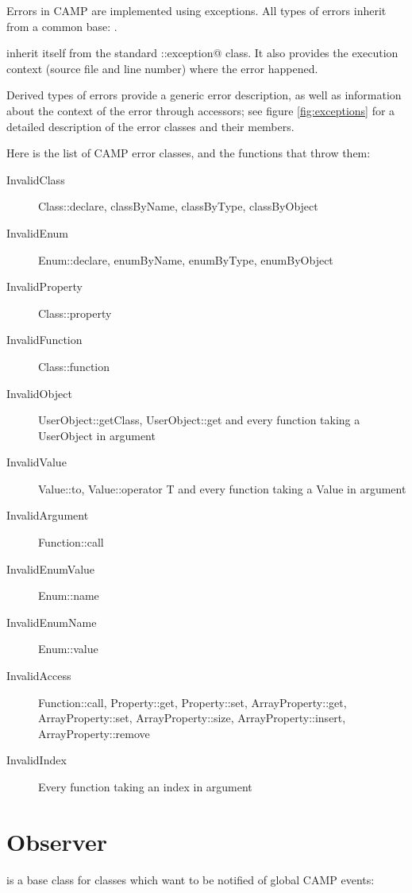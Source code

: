 \documentclass[a4paper, twoside]{report}
\begin{document}
	Errors in CAMP are implemented using exceptions. All types of errors inherit from a common base:
	\verb@Error@.
	
	\verb@Error@ inherit itself from the standard \verb@std::exception@ class. It also provides the
	execution context (source file and line number) where the error happened.
	
	Derived types of errors provide a generic error description, as well as information about the context
	of the error through accessors; see	figure \ref{fig:exceptions} for a detailed description of the error
	classes and their members.
	

	Here is the list of CAMP error classes, and the functions that throw them:
	
	\begin{description}
		\item[InvalidClass] Class::declare, classByName, classByType, classByObject
		\item[InvalidEnum] Enum::declare, enumByName, enumByType, enumByObject
		\item[InvalidProperty] Class::property
		\item[InvalidFunction] Class::function
		\item[InvalidObject] UserObject::getClass, UserObject::get and every function taking a UserObject in argument
		\item[InvalidValue] Value::to, Value::operator T and every function taking a Value in argument
		\item[InvalidArgument] Function::call
		\item[InvalidEnumValue] Enum::name
		\item[InvalidEnumName] Enum::value
		\item[InvalidAccess] Function::call, Property::get, Property::set, ArrayProperty::get,
                         ArrayProperty::set, ArrayProperty::size, ArrayProperty::insert, ArrayProperty::remove
		\item[InvalidIndex] Every function taking an index in argument
	\end{description}

\chapter{Observer}

	\verb@Observer@ is a base class for classes which want to be notified of global CAMP events:
	
\end{document}
